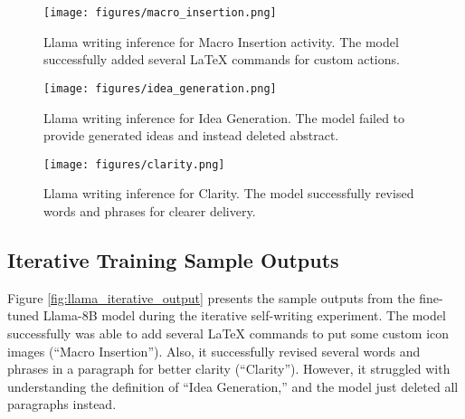 \begin{figure*}
    \centering
    \begin{subfigure}{0.4\textwidth}
        \texttt{[image: figures/macro\_insertion.png]}
        \caption{Llama writing inference for Macro Insertion activity. The model successfully added several LaTeX commands for custom actions.}
        \label{fig:llama_iter_sub_a}
    \end{subfigure}
    \hspace{0.05\textwidth}
    \begin{subfigure}{0.4\textwidth}
        \texttt{[image: figures/idea\_generation.png]}
        \caption{Llama writing inference for Idea Generation. The model failed to provide generated ideas and instead deleted abstract.}
        \label{fig:llama_iter_sub_d}
    \end{subfigure}
    \begin{subfigure}{0.43\textwidth}
        \texttt{[image: figures/clarity.png]}
        \caption{Llama writing inference for Clarity. The model successfully revised words and phrases for clearer delivery.}
        \label{fig:llama_iter_sub_b}
    \end{subfigure}
    \caption{Sample outputs from \textcolor{magenta}{Llama-8B-SW} during the self-writing experiment.}
    \label{fig:llama_iterative_output}
\end{figure*}

\subsection{Iterative Training Sample Outputs}

Figure \ref{fig:llama_iterative_output} presents the sample outputs from the fine-tuned Llama-8B model during the iterative self-writing experiment. The model successfully was able to add several LaTeX commands to put some custom icon images (``Macro Insertion''). Also, it successfully revised several words and phrases in a paragraph for better clarity (``Clarity''). However, it struggled with understanding the definition of ``Idea Generation,'' and the model just deleted all paragraphs instead. 

